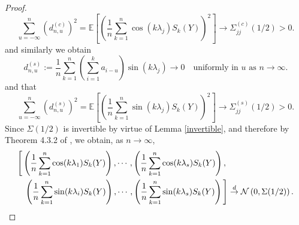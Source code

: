 \documentclass[12pt]{article}
\numberwithin{equation}{section}
\begin{document}
\begin{proof}
$$
\sum_{u=-\infty}^n\left(d^{(c)}_{n,u}\right)^2=\mathbb{E}\left[\left(\frac{1}{n}\sum_{k=1}^n\cos(k\lambda_{j})S_k(Y)\right)^2\right]\to\Sigma^{(c)}_{jj}(1/2)>0.
$$
and similarly we obtain 
$$
d^{(s)}_{n,u}:=\frac{1}{n}\sum_{k=1}^n\left(\sum_{i=1}^ka_{i-u}\right)\sin(k\lambda_j)\to0\quad\textrm{uniformly in }u\textrm{ as }n\to\infty.
$$
and that
$$
\sum_{u=-\infty}^n\left(d^{(s)}_{n,u}\right)^2=\mathbb{E}\left[\left(\frac{1}{n}\sum_{k=1}^n\sin(k\lambda_{j})S_k(Y)\right)^2\right]\to\Sigma^{(s)}_{jj}(1/2)>0.
$$
Since $\Sigma(1/2)$ is invertible by virtue of Lemma \ref{invertible}, and therefore by Theorem 4.3.2 of \cite{MR2977317},  we obtain, as $n\to\infty$,
\begin{eqnarray*}\lefteqn{
\Bigg[\left(\frac{1}{n}\sum_{k=1}^n\cos(k\lambda_{1})S_k(Y)\right),
\cdots,\left(\frac{1}{n}\sum_{k=1}^n\cos(k\lambda_{s})S_k(Y)\right),}\\
&& \left(\frac{1}{n}\sum_{k=1}^n\sin(k\lambda_{i})S_k(Y)\right),\cdots,\left(\frac{1}{n}\sum_{k=1}^n\sin(k\lambda_{s})S_k(Y)\right)\Bigg]\overset{d}{\rightarrow}\mathcal{N}\left(0,\Sigma(1/2)\right). 
\end{eqnarray*}


\end{proof}
\end{document}
